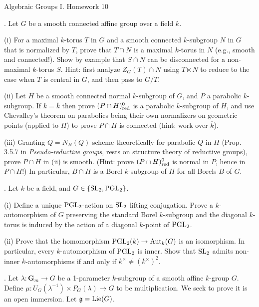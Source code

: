 \documentclass[10pt]{amsart}
\begin{document}
\newpage

\centerline{\sc Algebraic Groups I. Homework 10}

\medskip{}.  Let $G$ be a smooth connected affine group over a field $k$.

(i) For a maximal $k$-torus $T$ in $G$ and a smooth connected $k$-subgroup $N$ in $G$
that is normalized by $T$, 
prove that $T \cap N$ is a maximal $k$-torus in $N$ (e.g., smooth and connected!).
Show by example that $S \cap N$ can be disconnected for a non-maximal $k$-torus $S$.
Hint: first analyze $Z_G(T) \cap N$ using $T \ltimes N$ to reduce to the case
when $T$ is central in $G$, and then pass to $G/T$. 

(ii) Let $H$ be a smooth connected normal $k$-subgroup of $G$, and
$P$ a parabolic $k$-subgroup.  If $k = \overline{k}$ then 
prove $(P \cap H)_{\rm{red}}^0$ is a parabolic
$k$-subgroup of $H$, and use Chevalley's theorem on parabolics being their
own normalizers on geometric points 
(applied to $H$) to prove $P \cap H$ is connected (hint: work over $\overline{k}$). 

(iii) Granting $Q = N_H(Q)$ scheme-theoretically for parabolic $Q$ in $H$
 (Prop. 3.5.7 in {\em Pseudo-reductive
groups}, rests on structure theory of reductive groups), prove $P \cap H$ in (ii) is smooth.
(Hint: prove $(P \cap H)_{\rm{red}}^0$ is normal in $P$, hence in $P \cap H$!) 
In particular, $B \cap H$ is a Borel $k$-subgroup of $H$ for all Borels $B$ of $G$.

\medskip{}.  Let $k$ be a field, and $G \in \{{\rm{SL}}_2, {\rm{PGL}}_2\}$.  

(i) Define a unique ${\rm{PGL}}_2$-action on ${\rm{SL}}_2$ lifting conjugation. Prove 
a $k$-automorphism of $G$ preserving the standard Borel $k$-subgroup and the
diagonal $k$-torus is induced by the action of a diagonal $k$-point of 
${\rm{PGL}}_2$.

(ii) Prove that the homomorphism ${\rm{PGL}}_2(k) \rightarrow
{\rm{Aut}}_k(G)$ is an isomorphism.  In particular,
every $k$-automorphism of ${\rm{PGL}}_2$ is inner. Show that
${\rm{SL}}_2$ admits non-inner $k$-automorphisms if and only if $k^{\times} \ne (k^{\times})^2$.

\medskip{}. Let $\lambda:\mathbf{G}_m \rightarrow G$ be a 1-parameter $k$-subgroup of a smooth 
affine $k$-group $G$. 
 Define  $\mu:U_G(\lambda^{-1}) \times P_G(\lambda) \rightarrow G$ 
to be multiplication.  We seek to prove it is an open immersion. 
 Let $\mathfrak{g} = {\rm{Lie}}(G)$.
 
\end{document}
